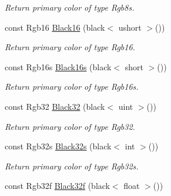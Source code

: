 \begin{DoxyCompactItemize}
\begin{DoxyCompactList}\small\item\em Return primary color of type Rgb8s. \end{DoxyCompactList}\item 
\hypertarget{group___primary_colors_ga1263dd447c159fdada79165ade3ac56b}{const Rgb16 \hyperlink{group___primary_colors_ga1263dd447c159fdada79165ade3ac56b}{Black16} (black$<$ ushort $>$())}\label{group___primary_colors_ga1263dd447c159fdada79165ade3ac56b}

\begin{DoxyCompactList}\small\item\em Return primary color of type Rgb16. \end{DoxyCompactList}\item 
\hypertarget{group___primary_colors_ga0b670bffa2bec06760670923e33e92b4}{const Rgb16s \hyperlink{group___primary_colors_ga0b670bffa2bec06760670923e33e92b4}{Black16s} (black$<$ short $>$())}\label{group___primary_colors_ga0b670bffa2bec06760670923e33e92b4}

\begin{DoxyCompactList}\small\item\em Return primary color of type Rgb16s. \end{DoxyCompactList}\item 
\hypertarget{group___primary_colors_ga7eed552da9dfa59530645096d39c5a90}{const Rgb32 \hyperlink{group___primary_colors_ga7eed552da9dfa59530645096d39c5a90}{Black32} (black$<$ uint $>$())}\label{group___primary_colors_ga7eed552da9dfa59530645096d39c5a90}

\begin{DoxyCompactList}\small\item\em Return primary color of type Rgb32. \end{DoxyCompactList}\item 
\hypertarget{group___primary_colors_ga17731be1ee8f6db2009ed73956281eea}{const Rgb32s \hyperlink{group___primary_colors_ga17731be1ee8f6db2009ed73956281eea}{Black32s} (black$<$ int $>$())}\label{group___primary_colors_ga17731be1ee8f6db2009ed73956281eea}

\begin{DoxyCompactList}\small\item\em Return primary color of type Rgb32s. \end{DoxyCompactList}\item 
\hypertarget{group___primary_colors_ga7e8acde084a97e61751907b0b3d4e675}{const Rgb32f \hyperlink{group___primary_colors_ga7e8acde084a97e61751907b0b3d4e675}{Black32f} (black$<$ float $>$())}\label{group___primary_colors_ga7e8acde084a97e61751907b0b3d4e675}


\end{DoxyCompactItemize}
